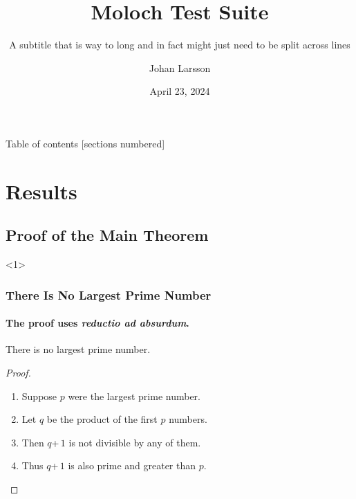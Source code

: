 

\title{Moloch Test Suite}
\subtitle{A subtitle that is way to long and in fact might just need to be split across lines}

\author[Johan]{Johan Larsson}
\date{April 23, 2024}



\START
\showoutput

\begin{frame}{Table of contents}
  [sections numbered]
  \tableofcontents[hideallsubsections]
\end{frame}

\section{Results}

\subsection{Proof of the Main Theorem}

\begin{frame}<1>
  \frametitle{There Is No Largest Prime Number}
  \framesubtitle{The proof uses \textit{reductio ad absurdum}.}

  \begin{theorem}
    There is no largest prime number.
  \end{theorem}
  \begin{proof}
    \begin{enumerate}
      \item<1-| alert@1> Suppose $p$ were the largest prime number.
      \item<2-> Let $q$ be the product of the first $p$ numbers.
      \item<3-> Then $q$\;+\,$1$ is not divisible by any of them.
      \item<1-> Thus $q$\;+\,$1$ is also prime and greater than $p$.\qedhere
    \end{enumerate}
  \end{proof}
\end{frame}

\vfil\break
\END

